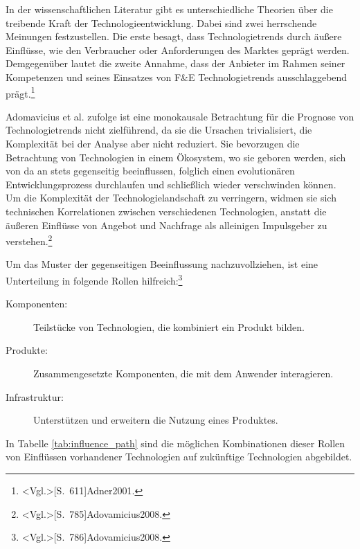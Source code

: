 In der wissenschaftlichen Literatur gibt es unterschiedliche Theorien über die treibende Kraft der Technologieentwicklung. Dabei sind zwei herrschende Meinungen festzustellen. Die erste besagt, dass Technologietrends durch äußere Einflüsse, wie den Verbraucher oder Anforderungen des Marktes geprägt werden. Demgegenüber lautet die zweite Annahme, dass der Anbieter im Rahmen seiner Kompetenzen und seines Einsatzes von F\&E Technologietrends ausschlaggebend prägt.\footnote{\citeNP<Vgl.>[S.~611]{Adner2001}.}

Adomavicius et al. zufolge ist eine monokausale Betrachtung für die Prognose von Technologietrends nicht zielführend, da sie die Ursachen trivialisiert, die Komplexität bei der Analyse aber nicht reduziert. Sie bevorzugen die Betrachtung von Technologien in einem Ökosystem, wo sie geboren werden, sich von da an stets gegenseitig beeinflussen, folglich einen evolutionären Entwicklungsprozess durchlaufen und schließlich wieder verschwinden können. Um die Komplexität der Technologielandschaft zu verringern, widmen sie sich technischen Korrelationen zwischen verschiedenen Technologien, anstatt die äußeren Einflüsse von Angebot und Nachfrage als alleinigen Impulsgeber zu verstehen.\footnote{\citeNP<Vgl.>[S.~785]{Adovamicius2008}.}

Um das Muster der gegenseitigen Beeinflussung nachzuvollziehen, ist eine Unterteilung in folgende Rollen hilfreich:\footnote{\citeNP<Vgl.>[S.~786]{Adovamicius2008}.}
\begin{description}
	\item[Komponenten:] Teilstücke von Technologien, die kombiniert ein Produkt bilden.
	\item[Produkte:] Zusammengesetzte Komponenten, die mit dem Anwender interagieren.
	\item[Infrastruktur:] Unterstützen und erweitern die Nutzung eines Produktes.
\end{description}

In Tabelle \ref{tab:influence_path} sind die möglichen Kombinationen dieser Rollen von Einflüssen vorhandener Technologien auf zukünftige Technologien abgebildet.

